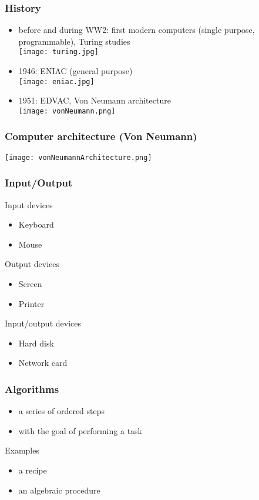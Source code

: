 \begin{frame}
  \frametitle{History}
  \begin{itemize}
  \item before and during WW2: first modern computers (single purpose,
    programmable), \alert{Turing} studies \\\texttt{[image: turing.jpg]}
  \item 1946: \alert{ENIAC} (general purpose) \\\texttt{[image: eniac.jpg]}
  \item 1951: \alert{EDVAC}, Von Neumann architecture \\\texttt{[image: vonNeumann.png]}
  \end{itemize}
\end{frame}

\begin{frame}
  \frametitle{Computer architecture (Von Neumann)}
  \texttt{[image: vonNeumannArchitecture.png]}
\end{frame}

\begin{frame}
  \frametitle{Input/Output}
  \begin{block}{Input devices}
    \begin{itemize}
    \item Keyboard
    \item Mouse
    \end{itemize}
  \end{block}
  \pause
  \begin{block}{Output devices}
    \begin{itemize}
    \item Screen
    \item Printer
    \end{itemize}
  \end{block}
  \pause
  \begin{block}{Input/output devices}
    \begin{itemize}
    \item Hard disk
    \item Network card
    \end{itemize}
  \end{block}
\end{frame}

\begin{frame}
  \frametitle{Algorithms}
  \begin{itemize}
  \item a series of ordered \alert{steps}
  \item with the goal of performing a \alert{task}
  \end{itemize}
  \pause
  \begin{block}{Examples}
    \begin{itemize}
    \item a recipe
    \item an algebraic procedure
    \end{itemize}
  \end{block}
\end{frame}

